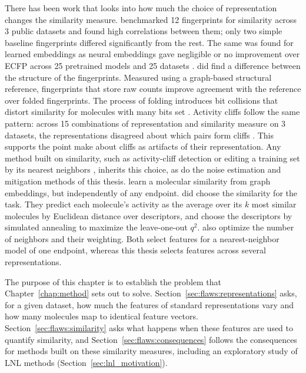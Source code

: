 There has been work that looks into how much the choice of representation changes the similarity measure. \citet{Riniker2013} benchmarked 12 fingerprints for similarity across 3 public datasets and found high correlations between them; only two simple baseline fingerprints differed significantly from the rest. The same was found for learned embeddings as neural embeddings gave negligible or no improvement over ECFP across 25 pretrained models and 25 datasets \citep{Praski2025}. \citet{Huber2026} did find a difference between the structure of the fingerprints. Measured using a graph-based structural reference, fingerprints that store raw counts improve agreement with the reference over folded fingerprints. The process of folding introduces bit collisions that distort similarity for molecules with many bits set \citep{Huber2026}. Activity cliffs follow the same pattern: across 15 combinations of representation and similarity measure on 3 datasets, the representations disagreed about which pairs form cliffs \citep{DabrowskiTumanski2026}. This supports the point \citet{MedinaFranco2013} make about cliffs as artifacts of their representation. Any method built on similarity, such as activity-cliff detection or editing a training set by its nearest neighbors \citep{Wilson1972}, inherits this choice, as do the noise estimation and mitigation methods of this thesis. \citet{Coupry2022} learn a molecular similarity from graph embeddings, but independently of any endpoint. \citet{Zheng2000} did choose the similarity for the task. They predict each molecule's activity as the average over its $k$ most similar molecules by Euclidean distance over descriptors, and choose the descriptors by simulated annealing to maximize the leave-one-out $q^2$. \citet{Itskowitz2005} also optimize the number of neighbors and their weighting. Both select features for a nearest-neighbor model of one endpoint, whereas this thesis selects features across several representations.

The purpose of this chapter is to establish the problem that Chapter~\ref{chap:method} sets out to solve. Section~\ref{sec:flaws:representations} asks, for a given dataset, how much the features of standard representations vary and how many molecules map to identical feature vectors. Section~\ref{sec:flaws:similarity} asks what happens when these features are used to quantify similarity, and Section~\ref{sec:flaws:consequences} follows the consequences for methods built on these similarity measures, including an exploratory study of LNL methods (Section~\ref{sec:lnl_motivation}).


